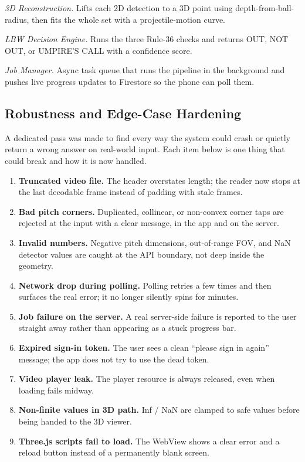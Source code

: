 \documentclass[12pt,a4paper]{report}
\begin{document}
\emph{3D Reconstruction.} Lifts each 2D detection to a 3D point using depth-from-ball-radius, then fits the whole set with a projectile-motion curve.

\emph{LBW Decision Engine.} Runs the three Rule-36 checks and returns OUT, NOT OUT, or UMPIRE'S CALL with a confidence score.

\emph{Job Manager.} Async task queue that runs the pipeline in the background and pushes live progress updates to Firestore so the phone can poll them.

\subsection{Robustness and Edge-Case Hardening}
\label{sec:hardening}

A dedicated pass was made to find every way the system could crash or quietly return a wrong answer on real-world input. Each item below is one thing that could break and how it is now handled.

\begin{enumerate}
    \item \textbf{Truncated video file.} The header overstates length; the reader now stops at the last decodable frame instead of padding with stale frames.
    \item \textbf{Bad pitch corners.} Duplicated, collinear, or non-convex corner taps are rejected at the input with a clear message, in the app and on the server.
    \item \textbf{Invalid numbers.} Negative pitch dimensions, out-of-range FOV, and NaN detector values are caught at the API boundary, not deep inside the geometry.
    \item \textbf{Network drop during polling.} Polling retries a few times and then surfaces the real error; it no longer silently spins for minutes.
    \item \textbf{Job failure on the server.} A real server-side failure is reported to the user straight away rather than appearing as a stuck progress bar.
    \item \textbf{Expired sign-in token.} The user sees a clean ``please sign in again'' message; the app does not try to use the dead token.
    \item \textbf{Video player leak.} The player resource is always released, even when loading fails midway.
    \item \textbf{Non-finite values in 3D path.} Inf / NaN are clamped to safe values before being handed to the 3D viewer.
    \item \textbf{Three.js scripts fail to load.} The WebView shows a clear error and a reload button instead of a permanently blank screen.
\end{enumerate}
\end{document}
